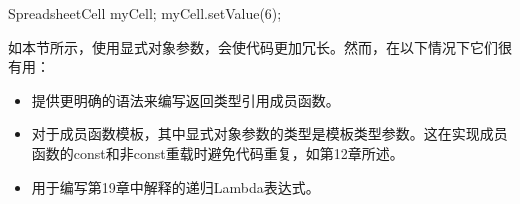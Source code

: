 \begin{cpp}
SpreadsheetCell myCell;
myCell.setValue(6);
\end{cpp}

如本节所示，使用显式对象参数，会使代码更加冗长。然而，在以下情况下它们很有用：

\begin{itemize}
\item
提供更明确的语法来编写返回类型引用成员函数。

\item
对于成员函数模板，其中显式对象参数的类型是模板类型参数。这在实现成员函数的const和非const重载时避免代码重复，如第12章所述。

\item
用于编写第19章中解释的递归Lambda表达式。
\end{itemize}










